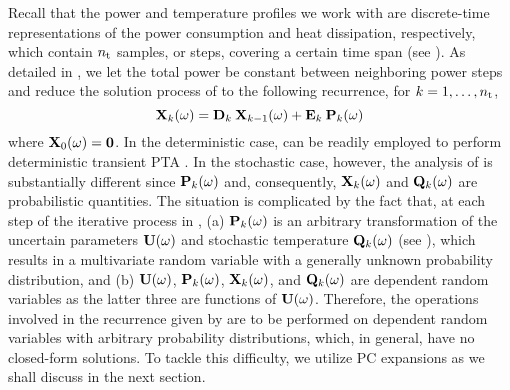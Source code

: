 Recall that the power and temperature profiles we work with are discrete-time representations of the power consumption and heat dissipation, respectively, which contain ${n_\text{t}}$ samples, or steps, covering a certain time span (see ).
As detailed in , we let the total power be constant between neighboring power steps and reduce the solution process of  to the following recurrence, for $k = 1, \dotsc, {n_\text{t}}$,
\begin{equation} \elabel{recurrence}
  \vX_k(\o) = \mCF_k \: \vX_{k - 1}(\o) + \mCS_k \: \vP_k(\o)
\end{equation}
where $\mathbf{X}_0(\omega) = \mathbf{0}$.
In the deterministic case,  can be readily employed to perform deterministic transient PTA \cite{thiele2011, ukhov2012}.
In the stochastic case, however, the analysis of  is substantially different since $\mathbf{P}_k(\omega)$ and, consequently, $\mathbf{X}_k(\omega)$ and $\mathbf{Q}_k(\omega)$ are probabilistic quantities.
The situation is complicated by the fact that, at each step of the iterative process in , (a) $\mathbf{P}_k(\omega)$ is an arbitrary transformation of the uncertain parameters $\mathbf{U}(\omega)$ and stochastic temperature $\mathbf{Q}_k(\omega)$ (see ), which results in a multivariate random variable with a generally unknown probability distribution, and (b) $\mathbf{U}(\omega)$, $\mathbf{P}_k(\omega)$, $\mathbf{X}_k(\omega)$, and $\mathbf{Q}_k(\omega)$ are dependent random variables as the latter three are functions of $\mathbf{U}(\omega)$.
Therefore, the operations involved in the recurrence given by  are to be performed on dependent random variables with arbitrary probability distributions, which, in general, have no closed-form solutions.
To tackle this difficulty, we utilize PC expansions as we shall discuss in the next section.
